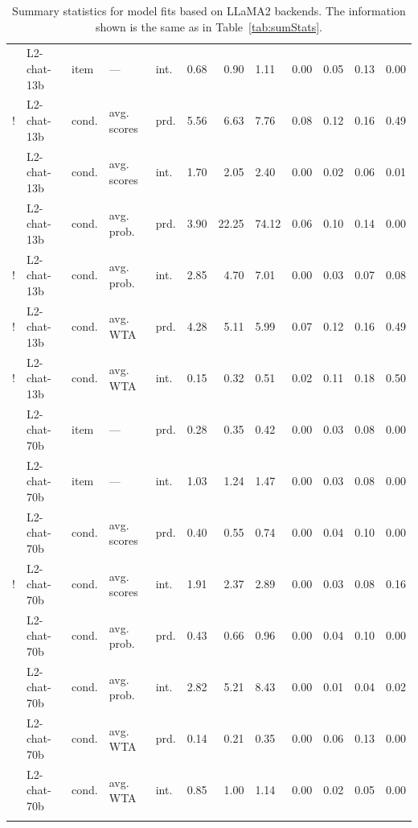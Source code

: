 \documentclass[fleqn]{article}
\begin{document}
\begin{table}[t]
\begin{tabular}{cllllcrlcrlc}
    & L2-chat-13b & item  & ---         & int. & 0.68  & 0.90   & 1.11   & 0.00 & 0.05 & 0.13 & 0.00 \\
  ! & L2-chat-13b & cond. & avg. scores & prd. & 5.56  & 6.63   & 7.76   & 0.08 & 0.12 & 0.16 & 0.49 \\
    & L2-chat-13b & cond. & avg. scores & int. & 1.70  & 2.05   & 2.40   & 0.00 & 0.02 & 0.06 & 0.01 \\
    & L2-chat-13b & cond. & avg. prob.  & prd. & 3.90  & 22.25  & 74.12  & 0.06 & 0.10 & 0.14 & 0.00 \\
  ! & L2-chat-13b & cond. & avg. prob.  & int. & 2.85  & 4.70   & 7.01   & 0.00 & 0.03 & 0.07 & 0.08 \\
  ! & L2-chat-13b & cond. & avg. WTA    & prd. & 4.28  & 5.11   & 5.99   & 0.07 & 0.12 & 0.16 & 0.49 \\
  ! & L2-chat-13b & cond. & avg. WTA    & int. & 0.15  & 0.32   & 0.51   & 0.02 & 0.11 & 0.18 & 0.50 \\ \addlinespace[0.5em]
    & L2-chat-70b & item  & ---         & prd. & 0.28  & 0.35   & 0.42   & 0.00 & 0.03 & 0.08 & 0.00 \\
    & L2-chat-70b & item  & ---         & int. & 1.03  & 1.24   & 1.47   & 0.00 & 0.03 & 0.08 & 0.00 \\
    & L2-chat-70b & cond. & avg. scores & prd. & 0.40  & 0.55   & 0.74   & 0.00 & 0.04 & 0.10 & 0.00 \\
  ! & L2-chat-70b & cond. & avg. scores & int. & 1.91  & 2.37   & 2.89   & 0.00 & 0.03 & 0.08 & 0.16 \\
    & L2-chat-70b & cond. & avg. prob.  & prd. & 0.43  & 0.66   & 0.96   & 0.00 & 0.04 & 0.10 & 0.00 \\
    & L2-chat-70b & cond. & avg. prob.  & int. & 2.82  & 5.21   & 8.43   & 0.00 & 0.01 & 0.04 & 0.02 \\
    & L2-chat-70b & cond. & avg. WTA    & prd. & 0.14  & 0.21   & 0.35   & 0.00 & 0.06 & 0.13 & 0.00 \\
    & L2-chat-70b & cond. & avg. WTA    & int. & 0.85  & 1.00   & 1.14   & 0.00 & 0.02 & 0.05 & 0.00 \\

   \bottomrule \\
\end{tabular}
\caption{
  Summary statistics for model fits based on LLaMA2 backends.
  The information shown is the same as in Table~\ref{tab:sumStats}.
}
\label{tab:sumStats-LLaMA2}
\end{table}


\end{document}
